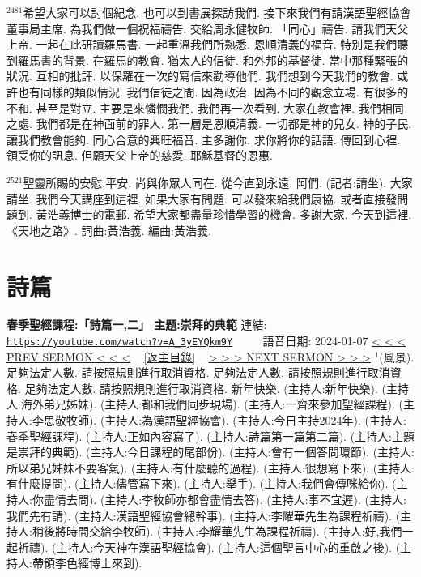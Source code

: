 \documentclass{book}
\begin{document}
$^{2481}$希望大家可以討個紀念.
也可以到書展探訪我們.
接下來我們有請漢語聖經協會董事局主席.
為我們做一個祝福禱告.
交給周永健牧師.
「同心」禱告.
請我們天父上帝.
一起在此研讀羅馬書.
一起重溫我們所熟悉.
恩順清義的福音.
特別是我們聽到羅馬書的背景.
在羅馬的教會.
猶太人的信徒.
和外邦的基督徒.
當中那種緊張的狀況.
互相的批評.
以保羅在一次的寫信來勸導他們.
我們想到今天我們的教會.
或許也有同樣的類似情況.
我們信徒之間.
因為政治.
因為不同的觀念立場.
有很多的不和.
甚至是對立.
主要是來憐憫我們.
我們再一次看到.
大家在教會裡.
我們相同之處.
我們都是在神面前的罪人.
第一層是恩順清義.
一切都是神的兒女.
神的子民.
讓我們教會能夠.
同心合意的興旺福音.
主多謝你.
求你將你的話語.
傳回到心裡.
領受你的訊息.
但願天父上帝的慈愛.
耶穌基督的恩惠.

$^{2521}$聖靈所賜的安慰,平安.
尚與你眾人同在.
從今直到永遠.
阿們.
(記者:請坐).
大家請坐.
我們今天講座到這裡.
如果大家有問題.
可以發來給我們康協.
或者直接發問題到.
黃浩義博士的電郵.
希望大家都盡量珍惜學習的機會.
多謝大家.
今天到這裡.
《天地之路》.
詞曲:黃浩義.
編曲:黃浩義.
\newpage



\section{詩篇}
\label{sec:A_3yEYQkm9Y}
\textbf{春季聖經課程:「詩篇一,二」 主題:崇拜的典範}
\newline
\newline
連結: \href{https://youtube.com/watch?v=A_3yEYQkm9Y}{\texttt{https://youtube.com/watch?v=A\_3yEYQkm9Y}} ~~~~ 語音日期: 2024-01-07
\newline
\newline
\hyperref[sec:VhiGoXEG1RY]{\small{< < < PREV SERMON < < <}}
~
\hyperref[sec:index]{\small{[返主目錄]}}
~
\hyperref[sec:SrQmAQLb4ew]{\small{> > > NEXT SERMON > > >}}
\newline
\newline
$^{1}$(風景).
足夠法定人數.
請按照規則進行取消資格.
足夠法定人數.
請按照規則進行取消資格.
足夠法定人數.
請按照規則進行取消資格.
新年快樂.
(主持人:新年快樂).
(主持人:海外弟兄姊妹).
(主持人:都和我們同步現場).
(主持人:一齊來參加聖經課程).
(主持人:李思敬牧師).
(主持人:為漢語聖經協會).
(主持人:今日主持2024年).
(主持人:春季聖經課程).
(主持人:正如內容寫了).
(主持人:詩篇第一篇第二篇).
(主持人:主題是崇拜的典範).
(主持人:今日課程的尾部份).
(主持人:會有一個答問環節).
(主持人:所以弟兄姊妹不要客氣).
(主持人:有什麼聽的過程).
(主持人:很想寫下來).
(主持人:有什麼提問).
(主持人:儘管寫下來).
(主持人:舉手).
(主持人:我們會傳咪給你).
(主持人:你盡情去問).
(主持人:李牧師亦都會盡情去答).
(主持人:事不宜遲).
(主持人:我們先有請).
(主持人:漢語聖經協會總幹事).
(主持人:李耀華先生為課程祈禱).
(主持人:稍後將時間交給李牧師).
(主持人:李耀華先生為課程祈禱).
(主持人:好,我們一起祈禱).
(主持人:今天神在漢語聖經協會).
(主持人:這個聖言中心的重啟之後).
(主持人:帶領李色經博士來到).
\end{document}

